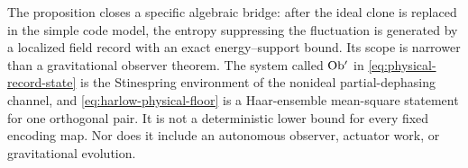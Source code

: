 The proposition closes a specific algebraic bridge: after the ideal clone is
replaced in the simple code model, the entropy suppressing the fluctuation is
generated by a localized field record with an exact energy--support bound.
Its scope is narrower than a gravitational observer theorem.  The system
called ${\rm Ob'}$ in \cref{eq:physical-record-state} is the Stinespring
environment of the nonideal partial-dephasing channel, and
\cref{eq:harlow-physical-floor} is a Haar-ensemble mean-square statement for
one orthogonal pair.  It is not a deterministic lower bound for every fixed
encoding map.  Nor does it include an autonomous observer, actuator work, or
gravitational evolution.
